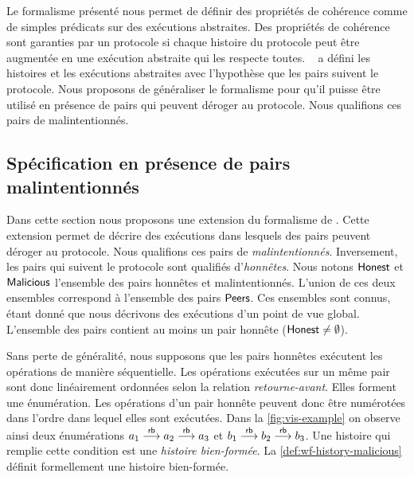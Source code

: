 Le formalisme présenté nous permet de définir des propriétés de cohérence comme de simples prédicats sur des exécutions abstraites.
Des propriétés de cohérence sont garanties par un protocole si chaque histoire du protocole peut être augmentée en une exécution abstraite qui les respecte toutes.
~\textcite{burckhardt_eventualconsistency_2014} a défini les histoires et les exécutions abstraites avec l'hypothèse que les pairs  suivent le protocole.
Nous proposons de généraliser le formalisme pour qu'il puisse être utilisé en présence de pairs qui peuvent déroger au protocole.
Nous qualifions ces pairs de malintentionnés.


\subsection{Spécification en présence de pairs malintentionnés}\label{subsec:consistency-spec-malicious}

%

Dans cette section nous proposons une extension du formalisme de \textcite{burckhardt_eventualconsistency_2014}.
Cette extension permet de décrire des exécutions dans lesquels des pairs peuvent déroger au protocole.
Nous qualifions ces pairs de \emph{malintentionnés}.
Inversement, les pairs qui suivent le protocole sont qualifiés d'\emph{honnêtes}.
Nous notons $\operatorname{\mathsf{Honest}}$ et $\operatorname{\mathsf{Malicious}}$ l'ensemble des pairs honnêtes et malintentionnés.
L'union de ces deux ensembles correspond à l'ensemble des pairs $\operatorname{\mathsf{Peers}}$.
Ces ensembles sont connus, étant donné que nous décrivons des exécutions d'un point de vue global.
L'ensemble des pairs contient au moins un pair honnête ($\operatorname{\mathsf{Honest}} \neq \emptyset$).

Sans perte de généralité, nous supposons que les pairs honnêtes exécutent les opérations de manière séquentielle.
Les opérations exécutées sur un même pair sont donc linéairement ordonnées selon la relation \emph{retourne-avant}.
Elles forment une énumération.
Les opérations d'un pair honnête peuvent donc être numérotées dans l'ordre dans lequel elles sont exécutées.
Dans la \autoref{fig:vis-example} on observe ainsi deux énumérations $a_1 \overset{\mathsf{rb}}{\longrightarrow} a_2 \overset{\mathsf{rb}}{\longrightarrow} a_3$ et $b_1 \overset{\mathsf{rb}}{\longrightarrow} b_2 \overset{\mathsf{rb}}{\longrightarrow} b_3$.
Une histoire qui remplie cette condition est une \emph{histoire bien-formée}.
La \autoref{def:wf-history-malicious} définit formellement une histoire bien-formée.

